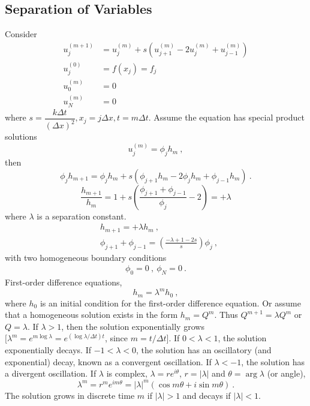 \documentclass[12pt,a4paper]{article}
\begin{document}
\subsection{Separation of Variables}
Consider
\begin{align*}
u_j^{(m+1)} &= u_j^{(m)}  +s\left(u_{j+1}^{(m)} -2u_j^{(m)} +u_{j-1}^{(m)} \right) \\
u_j^{(0)} &= f(x_j) = f_j \\
u_0^{(m)} &= 0 \\
u_N^{(m)} &= 0 
\end{align*}
where $s = \dfrac{k \Delta t}{(\Delta x)^2}, x_j = j \Delta x, t = m\Delta t$. Assume the equation has special product solutions
\begin{equation}
u_j^{(m)} = \phi_j h_m ~,
\end{equation}
then
\begin{equation*}
\phi_j h_{m+1} = \phi_j h_m +s(\phi_{j+1} h_m -2\phi_j h_m +\phi_{j-1} h_m) ~.
\end{equation*}
\begin{equation*}
\frac{h_{m+1} }{h_m} = 1+s\left(\frac{\phi_{j+1} +\phi_{j-1} }{\phi_j} -2\right) = +\lambda
\end{equation*}
where $\lambda$ is a separation constant.
\begin{align}
& h_{m+1} = +\lambda h_m ~, \\
& \phi_{j+1} +\phi_{j-1} = \left(\frac{-\lambda +1-2s}{s} \right) \phi_j ~,
\end{align}
with two homogeneous boundary conditions
\begin{align}
\phi_0 = 0 ~, ~\phi_N = 0 ~.
\end{align}
First-order difference equations, 
\begin{equation}
h_m = \lambda^m h_0 ~,
\end{equation}
where $h_0$ is an initial condition for the first-order difference equation. Or assume that a homogeneous solution exists in the form $h_m=Q^m$. Thus $Q^{m+1}=\lambda Q^m$ or $Q=\lambda$. If $\lambda > 1$, then the solution exponentially grows $[\lambda^m=e^{m \log \lambda}=e^{(\log \lambda/\Delta t)t}$, since $m=t/\Delta t]$. If $0<\lambda<1$, the solution exponentially decays. If $-1<\lambda<0$, the solution has an oscillatory (and exponential) decay, known as a convergent oscillation. If $\lambda<-1$, the solution has a divergent oscillation. If $\lambda$ is complex, $\lambda = r e^{i\theta}$, $r = |\lambda|$ and $\theta = \arg \lambda$ (or angle),
\begin{equation*}
\lambda^m = r^m e^{im\theta} = |\lambda|^m (\cos m\theta +i \sin m \theta) ~.
\end{equation*}
The solution grows in discrete time $m$ if $|\lambda|>1$ and decays if $|\lambda|<1$.
\end{document}
